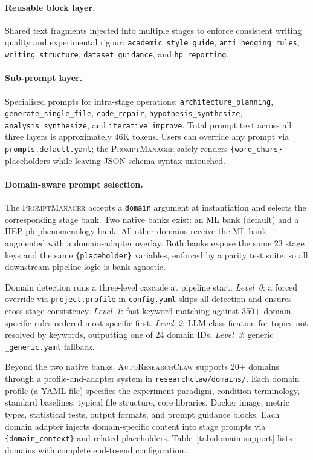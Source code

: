 \documentclass{llmxive}
\providecommand{\system}{\textsc{AutoResearchClaw}}
\begin{document}
\paragraph{Reusable block layer.}
Shared text fragments injected into multiple stages to enforce consistent writing quality and experimental rigour: \texttt{academic\_style\_guide}, \texttt{anti\_hedging\_rules}, \texttt{writing\_structure}, \texttt{dataset\_guidance}, and \texttt{hp\_reporting}.

\paragraph{Sub-prompt layer.}
Specialised prompts for intra-stage operations: \texttt{architecture\_planning}, \texttt{generate\_single\_file}, \texttt{code\_repair}, \texttt{hypothesis\_synthesize}, \texttt{analysis\_synthesize}, and \texttt{iterative\_improve}.
Total prompt text across all three layers is approximately 46K tokens.
Users can override any prompt via \texttt{prompts.default.yaml}; the \textsc{PromptManager} safely renders \texttt{\{word\_chars\}} placeholders while leaving JSON schema syntax untouched.

\paragraph{Domain-aware prompt selection.}
The \textsc{PromptManager} accepts a \texttt{domain} argument at instantiation and selects the corresponding stage bank.
Two native banks exist: an ML bank (default) and a HEP-ph phenomenology bank.
All other domains receive the ML bank augmented with a domain-adapter overlay.
Both banks expose the same 23 stage keys and the same \texttt{\{placeholder\}} variables, enforced by a parity test suite, so all downstream pipeline logic is bank-agnostic.

Domain detection runs a three-level cascade at pipeline start.
\emph{Level~0}: a forced override via \texttt{project.profile} in \texttt{config.yaml} skips all detection and ensures cross-stage consistency.
\emph{Level~1}: fast keyword matching against 350+ domain-specific rules ordered most-specific-first.
\emph{Level~2}: LLM classification for topics not resolved by keywords, outputting one of 24 domain IDs.
\emph{Level~3}: generic \texttt{\_generic.yaml} fallback.

Beyond the two native banks, \system{} supports 20+ domains through a profile-and-adapter system in \texttt{researchclaw/domains/}.
Each domain profile (a YAML file) specifies the experiment paradigm, condition terminology, standard baselines, typical file structure, core libraries, Docker image, metric types, statistical tests, output formats, and prompt guidance blocks.
Each domain adapter injects domain-specific content into stage prompts via \texttt{\{domain\_context\}} and related placeholders.
Table~\ref{tab:domain-support} lists domains with complete end-to-end configuration.
\end{document}

